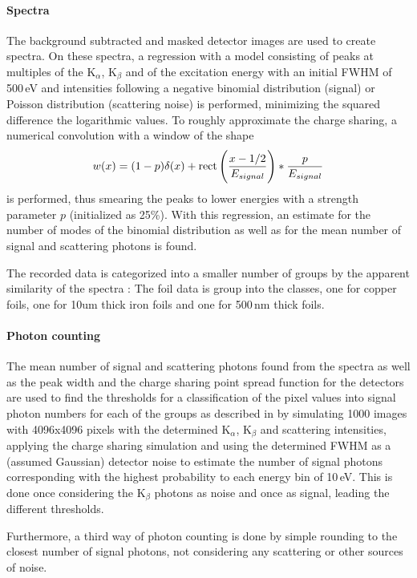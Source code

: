 \paragraph{Spectra}
The background subtracted and masked detector images are used to create spectra. On these spectra, a regression with a model consisting of peaks at multiples of the K$_\alpha$, K$_\beta$ and of the excitation energy with an initial FWHM of 500\,eV and intensities following a negative binomial distribution (signal) or Poisson distribution (scattering noise) is performed, minimizing the squared difference the logarithmic values. To roughly approximate the charge sharing, a numerical convolution with a  window of the shape
\begin{equation}
	w (x)= (1-p)\delta(x)+\operatorname{rect}\left(\frac{x-1/2}{E_{signal}}\right)*\frac{p}{E_{signal}}
\end{equation}
is performed, thus smearing the peaks to lower energies with a strength parameter $p$ (initialized as 25\%).
With this regression, an estimate for the number of modes of the binomial distribution as well as for the mean number of signal and scattering photons is found.

The recorded data is categorized into a smaller number of groups by the apparent similarity of the spectra : The foil data is group into the classes, one for copper foils, one for 10um thick iron foils and one for 500\,nm thick foils.


\paragraph{Photon counting}

The mean number of signal and scattering photons found from the spectra as well as the peak width and the  charge sharing point spread function for the detectors are used to find the thresholds for a classification of the pixel values into signal photon numbers for each of the groups as described in  by simulating 1000 images with 4096x4096 pixels with the determined K$_\alpha$, K$_\beta$ and scattering intensities, applying the charge sharing simulation and using the determined FWHM as a (assumed Gaussian) detector noise to estimate the number of signal photons corresponding with the highest probability to each energy bin of 10\,eV. This is done once  considering the K$_\beta$ photons as noise and once as signal, leading the different thresholds.

Furthermore, a third way of photon counting is done by simple rounding to the closest number of signal photons, not considering any scattering or other sources of noise. 









